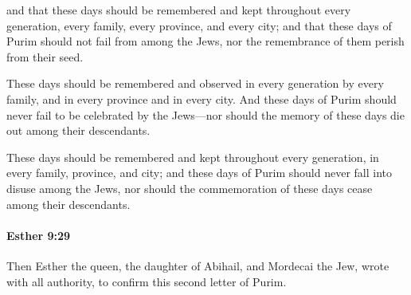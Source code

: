 			\begin{versebox}
					\item[BHS] 
					\item[LXX] 
					\item[ASV] and that these days should be remembered and kept throughout every generation, every family, every province, and every city; and that these days of Purim should not fail from among the Jews, nor the remembrance of them perish from their seed.
					\item[NIV] These days should be remembered and observed in every generation by every family, and in every province and in every city. And these days of Purim should never fail to be celebrated by the Jews—nor should the memory of these days die out among their descendants.
					\item[NRSV] These days should be remembered and kept throughout every generation, in every family, province, and city; and these days of Purim should never fall into disuse among the Jews, nor should the commemoration of these days cease among their descendants.
			\end{versebox}

		\paragraph{Esther 9:29} %
			\label{ESTHER-9-29}

			Then Esther the queen, the daughter of Abihail, and Mordecai the Jew, wrote with all authority, to confirm this second letter of Purim.

